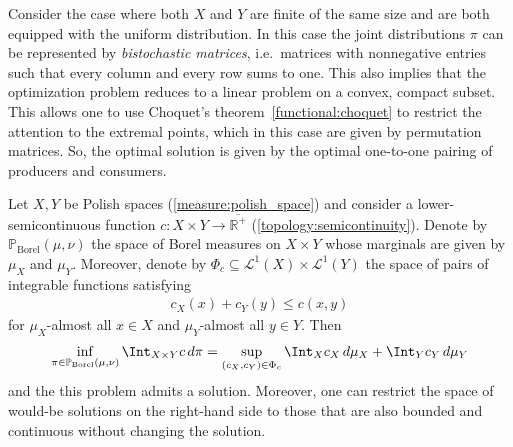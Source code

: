     \begin{example}
        Consider the case where both $X$ and $Y$ are finite of the same size and are both equipped with the uniform distribution. In this case the joint distributions $\pi$ can be represented by \textit{bistochastic matrices}, i.e.~matrices with nonnegative entries such that every column and every row sums to one. This also implies that the optimization problem reduces to a linear problem on a convex, compact subset. This allows one to use Choquet's theorem~\ref{functional:choquet} to restrict the attention to the extremal points, which in this case are given by permutation matrices. So, the optimal solution is given by the optimal one-to-one pairing of producers and consumers.
    \end{example}

    \begin{property}
        Let $X,Y$ be Polish spaces (\cref{measure:polish_space}) and consider a lower-semicontinuous function $c:X\times Y\rightarrow\overline{\mathbb{R}^+}$ (\cref{topology:semicontinuity}). Denote by $\mathbb{P}_{\text{Borel}}(\mu,\nu)$ the space of Borel measures on $X\times Y$ whose marginals are given by $\mu_X$ and $\mu_Y$. Moreover, denote by $\Phi_c\subseteq\mathcal{L}^1(X)\times\mathcal{L}^1(Y)$ the space of pairs of integrable functions satisfying
        \begin{gather}
            c_X(x)+c_Y(y)\leq c(x,y)
        \end{gather}
        for $\mu_X$-almost all $x\in X$ and $\mu_Y$-almost all $y\in Y$. Then
        \begin{gather}
            \inf_{\pi\in\mathbb{P}_{\text{Borel}}(\mu,\nu)}\Int_{X\times Y}c\,d\pi = \sup_{(c_X,c_Y)\in\Phi_c}\Int_Xc_X\,d\mu_X+\Int_Yc_Y\,d\mu_Y
        \end{gather}
        and the this problem admits a solution. Moreover, one can restrict the space of would-be solutions on the right-hand side to those that are also bounded and continuous without changing the solution.
    \end{property}


